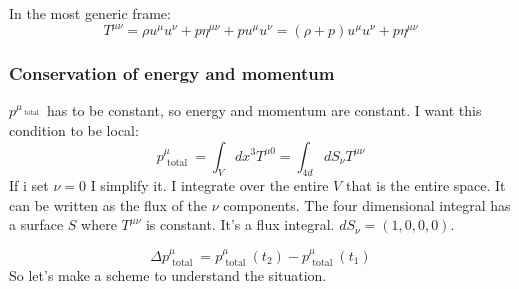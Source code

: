 In the most generic frame:
\begin{equation}
T^{\mu \nu } = \rho u^{\mu }u^{\nu }+ p \eta^{\mu \nu } + p u^{\mu } u^{\nu } = \left( \rho +p \right) u^{\mu }u^{\nu } + p \eta^{\mu \nu }
\end{equation}

\subsubsection{Conservation of energy and momentum}
$p^{\mu _{ \text{ total }}}$ has to be constant, so energy and momentum are constant.
I want this condition to be local:
\[
p^{\mu }_{ \text{ total } } = \int_{V}^{}{dx^{3}T^{\mu 0}} = \int_{4d}^{}{dS_{\nu }T^{\mu \nu }}
\]
If i set $\nu =0$ I simplify it. I integrate over the entire $V$ that is the entire space. It can be written as the flux of the $\nu $ components. The four dimensional integral has a surface $S$ where $T^{\mu \nu }$ is constant. It's a flux integral. $dS_{\nu } = \left( 1,0,0,0 \right)$.

\[
\Delta p^{\mu }_{ \text{ total }} = p^{\mu }_{ \text{ total }}\left( t_{2} \right) - p^{\mu }_{ \text{ total }}\left( t_{1} \right)
\]
So let's make a scheme to understand the situation.

